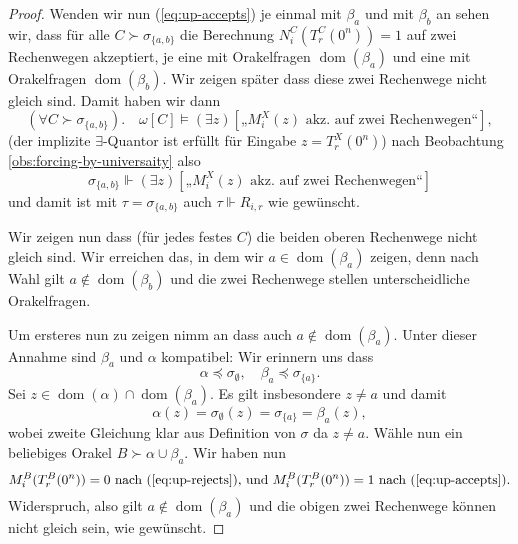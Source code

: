 \documentclass[nofonts]{uebung}
\theoremstyle{definition}
\DeclareMathOperator{\dom}{dom}
\begin{document}
\begin{proof}
    Wenden wir nun (\ref{eq:up-accepts}) je einmal mit $\beta_a$ und mit $\beta_b$ an sehen wir, dass
    für alle $C\succ \sigma_{\{a,b\}}$ die Berechnung $N^C_i(T^C_r(0^n))=1$ auf zwei Rechenwegen akzeptiert, je eine mit Orakelfragen $\dom(\beta_a)$ und eine mit Orakelfragen $\dom(\beta_b)$. Wir zeigen später dass diese zwei Rechenwege nicht gleich sind. Damit haben wir dann 
    \[ (\forall C\succ \sigma_{\{a,b\}}).\quad\omega[C]\vDash(\exists z)[\text{„$M_i^X(z)$ akz. auf zwei Rechenwegen“}], \]
    (der implizite $\exists$-Quantor ist erfüllt für Eingabe $z=T_r^X(0^n)$)
    nach Beobachtung \ref{obs:forcing-by-universaity} also
    \[ \sigma_{\{a,b\}} \Vdash(\exists z)[\text{„$M_i^X(z)$ akz. auf zwei Rechenwegen“}] \]
    und damit ist mit $\tau=\sigma_{\{a,b\}}$ auch $\tau\Vdash   R_{i,r}$ wie gewünscht.

    Wir zeigen nun dass (für jedes festes $C$) die beiden oberen Rechenwege nicht gleich sind. 
    Wir erreichen das, in dem wir $a\in\dom(\beta_a)$ zeigen, denn nach Wahl gilt $a\not\in\dom(\beta_b)$ und die zwei Rechenwege stellen unterscheidliche Orakelfragen.

    Um ersteres nun zu zeigen nimm an dass auch $a\not\in\dom(\beta_a)$.
    Unter dieser Annahme sind $\beta_a$ und $\alpha$ kompatibel:
    Wir erinnern uns dass 
    \[ \alpha\preceq\sigma_\emptyset, \quad \beta_a\preceq\sigma_{\{a\}}. \]
    Sei $z\in\dom(\alpha)\cap\dom(\beta_a)$. Es gilt insbesondere $z\neq a$ und damit
    \[ \alpha(z)=\sigma_\emptyset(z)=\sigma_{\{a\}}=\beta_a(z), \]
    wobei zweite Gleichung klar aus Definition von $\sigma$ da $z\neq a$.
    Wähle nun ein beliebiges Orakel $B\succ\alpha\cup\beta_a$.
    Wir haben nun 
    \[ M_i^B(T_r^B(0^n))=0 \text{ nach (\ref{eq:up-rejects}), und } M_i^B(T_r^B(0^n))=1 \text{ nach (\ref{eq:up-accepts}).} \]
    Widerspruch, also gilt $a\not\in\dom(\beta_a)$ und die obigen zwei Rechenwege können nicht gleich sein, wie gewünscht.
\end{proof}
\end{document}
